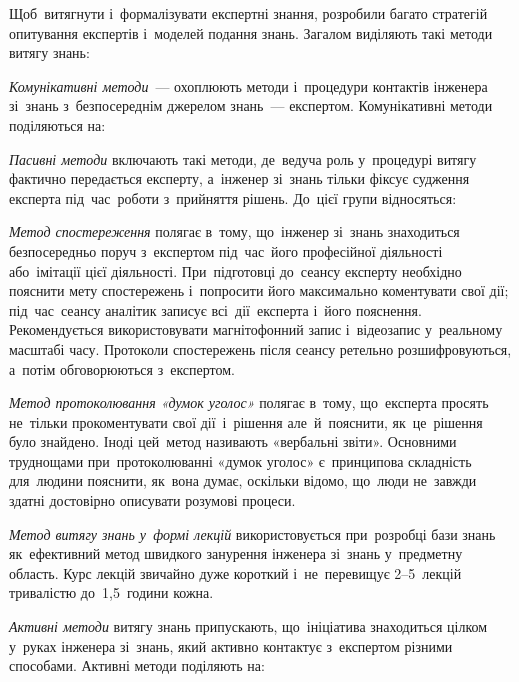 \documentclass[
  a4paper,
  oneside,
  BCOR = 10mm,
  DIV = 12,
  12pt,
  headings = normal,
]{scrartcl}
\begin{document}
      Щоб~витягнути і~формалізувати експертні знання, розробили багато стратегій опитування експертів і~моделей подання знань. Загалом виділяють такі методи витягу знань:
      \begin{hangenumerate}[leftmargin=0em]
        \item \emph{Комунікативні методи}~— охоплюють методи і~процедури контактів інженера зі~знань з~безпосереднім джерелом знань~— експертом. Комунікативні методи поділяються на:
          \begin{hangenumerate}[leftmargin=0em]
            \item \emph{Пасивні методи} включають такі методи, де~ведуча роль у~процедурі витягу фактично передається експерту, а~інженер зі~знань тільки фіксує судження експерта під~час~роботи з~прийняття рішень. До~цієї групи відносяться:
              \begin{hangenumerate}[leftmargin=0em]
                \item \emph{Метод спостереження} полягає в~тому, що~інженер зі~знань знаходиться безпосередньо поруч з~експертом під~час~його професійної діяльності або~імітації цієї діяльності. При~підготовці до~сеансу експерту необхідно пояснити мету спостережень і~попросити його максимально коментувати свої дії; під~час~сеансу аналітик записує всі~дії~експерта і~його пояснення. Рекомендується використовувати магнітофонний запис і~відеозапис у~реальному масштабі часу. Протоколи спостережень після сеансу ретельно розшифровуються, а~потім обговорюються з~експертом.
                \item \emph{Метод протоколювання «думок уголос»} полягає в~тому, що~експерта просять не~тільки прокоментувати свої дії~і~рішення але~й~пояснити, як~це~рішення було знайдено. Іноді цей~метод називають «вербальні звіти». Основними труднощами при~протоколюванні «думок уголос» є~принципова складність для~людини пояснити, як~вона думає, оскільки відомо, що~люди не~завжди здатні достовірно описувати розумові процеси.
                \item \emph{Метод витягу знань у~формі лекцій} використовується при~розробці бази знань як~ефективний метод швидкого занурення інженера зі~знань у~предметну область. Курс лекцій звичайно дуже короткий і~не~перевищує 2–5~лекцій тривалістю до~1,5~години кожна.
              \end{hangenumerate}
            \item \emph{Активні методи} витягу знань припускають, що~ініціатива знаходиться цілком у~руках інженера зі~знань, який активно контактує з~експертом різними способами. Активні методи поділяють на:

\end{hangenumerate}
\end{hangenumerate}
\end{document}
